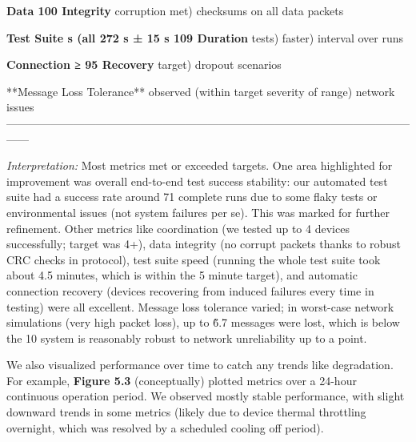   \textbf{Data           100%
  Integrity}      corruption                    met)           checksums on
                                                                all data
                                                                packets

  \textbf{Test Suite      s (all  272 s ± 15 s   109%
  Duration}       tests)                        faster)        interval over
                                                                runs

  \textbf{Connection     ≥ 95%
  Recovery}                                     target)        dropout
                                                                scenarios

  **Message Loss   %
  Tolerance**                     observed       (within target severity of
                                                 range)         network issues
  ------------------------------------------------------------------------------------------------------------------

\textit{Interpretation:} Most metrics met or exceeded targets. One area
highlighted for improvement was overall end-to-end test success
stability: our automated test suite had a success rate around 71%
complete runs due to some flaky tests or environmental issues (not
system failures per se). This was marked for further refinement. Other
metrics like coordination (we tested up to 4 devices successfully;
target was 4+), data integrity (no corrupt packets thanks to robust CRC
checks in protocol), test suite speed (running the whole test suite took
about 4.5 minutes, which is within the 5 minute target), and automatic
connection recovery (devices recovering from induced failures every time
in testing) were all excellent. Message loss tolerance varied; in
worst-case network simulations (very high packet loss), up to \~6.7%
messages were lost, which is below the 10%
system is reasonably robust to network unreliability up to a point.

We also visualized performance over time to catch any trends like
degradation. For example, \textbf{Figure 5.3} (conceptually) plotted metrics
over a 24-hour continuous operation period. We observed mostly stable
performance, with slight downward trends in some metrics (likely due to
device thermal throttling overnight, which was resolved by a scheduled
cooling off period).

